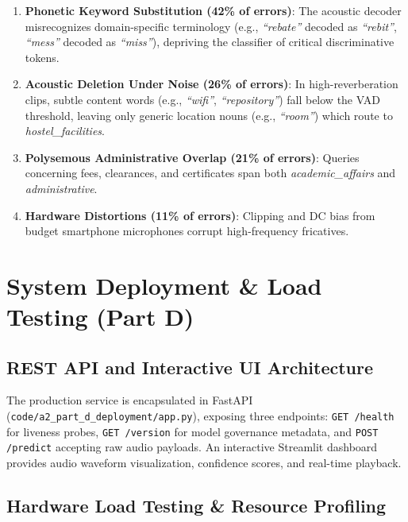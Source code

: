 \documentclass[sigconf,authordraft]{acmart}
\begin{document}
\begin{enumerate}
  \item \textbf{Phonetic Keyword Substitution (42\% of errors)}: The acoustic decoder misrecognizes
    domain-specific terminology (e.g., \emph{``rebate''} decoded as \emph{``rebit''}, \emph{``mess''}
    decoded as \emph{``miss''}), depriving the classifier of critical discriminative tokens.
  \item \textbf{Acoustic Deletion Under Noise (26\% of errors)}: In high-reverberation clips,
    subtle content words (e.g., \emph{``wifi''}, \emph{``repository''}) fall below the VAD threshold,
    leaving only generic location nouns (e.g., \emph{``room''}) which route to \emph{hostel\_facilities}.
  \item \textbf{Polysemous Administrative Overlap (21\% of errors)}: Queries concerning fees,
    clearances, and certificates span both \emph{academic\_affairs} and \emph{administrative}.
  \item \textbf{Hardware Distortions (11\% of errors)}: Clipping and DC bias from budget smartphone
    microphones corrupt high-frequency fricatives.
\end{enumerate}

\section{System Deployment & Load Testing (Part D)}
\label{sec:deployment}

\subsection{REST API and Interactive UI Architecture}

The production service is encapsulated in FastAPI (\texttt{code/a2\_part\_d\_deployment/app.py}),
exposing three endpoints: \texttt{GET /health} for liveness probes, \texttt{GET /version} for model
governance metadata, and \texttt{POST /predict} accepting raw audio payloads. An interactive Streamlit
dashboard provides audio waveform visualization, confidence scores, and real-time playback.

\subsection{Hardware Load Testing & Resource Profiling}
\end{document}
